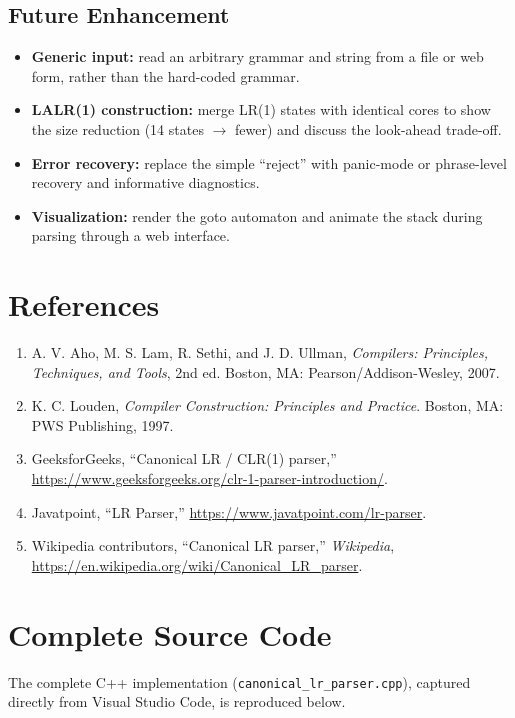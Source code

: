 \documentclass[11pt,a4paper]{report}
\begin{document}
\section{Future Enhancement}
\begin{itemize}
  \item \textbf{Generic input:} read an arbitrary grammar and string from a file or web form, rather than the hard-coded grammar.
  \item \textbf{LALR(1) construction:} merge LR(1) states with identical cores to show the size reduction (14 states $\rightarrow$ fewer) and discuss the look-ahead trade-off.
  \item \textbf{Error recovery:} replace the simple ``reject'' with panic-mode or phrase-level recovery and informative diagnostics.
  \item \textbf{Visualization:} render the goto automaton and animate the stack during parsing through a web interface.
\end{itemize}

\chapter{References}
\begin{enumerate}
  \item A. V. Aho, M. S. Lam, R. Sethi, and J. D. Ullman, \emph{Compilers: Principles, Techniques, and Tools}, 2nd ed. Boston, MA: Pearson/Addison-Wesley, 2007.
  \item K. C. Louden, \emph{Compiler Construction: Principles and Practice}. Boston, MA: PWS Publishing, 1997.
  \item GeeksforGeeks, ``Canonical LR / CLR(1) parser,'' \url{https://www.geeksforgeeks.org/clr-1-parser-introduction/}.
  \item Javatpoint, ``LR Parser,'' \url{https://www.javatpoint.com/lr-parser}.
  \item Wikipedia contributors, ``Canonical LR parser,'' \emph{Wikipedia}, \url{https://en.wikipedia.org/wiki/Canonical_LR_parser}.
\end{enumerate}

\appendix
\chapter{Complete Source Code}
\label{app:code}
The complete C++ implementation (\texttt{canonical\_lr\_parser.cpp}), captured
directly from Visual Studio Code, is reproduced below.
\end{document}
